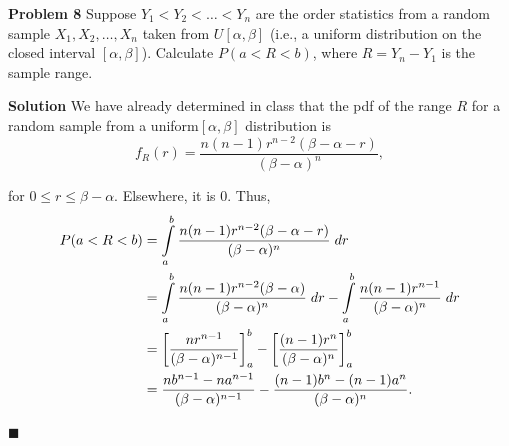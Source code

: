 \documentclass{article}
\newcommand{\mybox}{%
    \collectbox{%
        \setlength{\fboxsep}{1pt}%
        \fbox{\BOXCONTENT}%
    }%
}
\begin{document}
\noindent\mybox{\textbf{Problem 8}} \hspace{3mm} Suppose $Y_1 < Y_2 < \ldots < Y_n$ are the order statistics from a random sample $X_1, X_2, \ldots, X_n$ taken from $U[\alpha, \beta]$ (i.e., a uniform distribution on the closed interval $[\alpha, \beta]$).  Calculate $P(a < R < b)$, where $R = Y_n - Y_1$ is the sample range.

\vspace{7mm}

\noindent\mybox{\textbf{Solution}}  We have already determined in class that the pdf of the range $R$ for a random sample from a uniform$[\alpha,\beta]$ distribution is
$$
f_R(r) = \frac{n(n-1)r^{n-2}(\beta-\alpha-r)}{(\beta-\alpha)^n},
$$

\noindent for $0\leq r \leq \beta - \alpha$.  Elsewhere, it is $0$.  Thus,
\begin{align}
P(a<R<b) &= \int\limits_a^b \frac{n(n-1)r^{n-2}(\beta-\alpha-r)}{(\beta-\alpha)^n} \hspace{1mm} dr \\
&= \int\limits_a^b\frac{n(n-1)r^{n-2}(\beta-\alpha)}{(\beta-\alpha)^n} \hspace{1mm} dr - \int\limits_a^b\frac{n(n-1)r^{n-1}}{(\beta-\alpha)^n} \hspace{1mm} dr \\
&= \left[\frac{nr^{n-1}}{(\beta-\alpha)^{n-1}}\right]^b_a - \left[ \frac{(n-1)r^n}{(\beta-\alpha)^n}\right]^b_a \\
&= \frac{nb^{n-1}-na^{n-1}}{(\beta-\alpha)^{n-1}} - \frac{(n-1)b^n-(n-1)a^n}{(\beta-\alpha)^n}.
\end{align}

\vspace{-2mm}
\hfill$\blacksquare$
\end{document}

